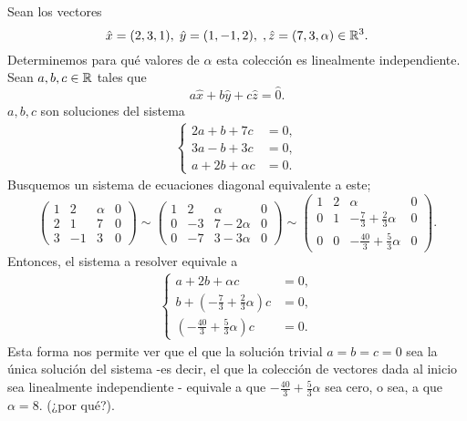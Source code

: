 \begin{ejem}
Sean los vectores
\[
\hat{x} = (2, 3, 1), \hspace{0.1cm} \hat{y} = (1, -1, 2),
\hspace{0.1cm}, \hat{z} = (7, 3, \alpha) \in \mathbb{R}^{3}.
\]
Determinemos para qué valores de $\alpha$ esta colección
es linealmente independiente.
Sean $a, b, c \in \mathbb{R}$ tales que
\[
a \hat{x} + b \hat{y} + c \hat{z} = \hat{0}.
\]
$a, b, c$ son soluciones del sistema
\begin{align*}
\begin{cases}
2a+b+7c & = 0, \\
3a-b+3c & = 0, \\
a+2b+\alpha c & = 0.
\end{cases}
\end{align*}
Busquemos un sistema de ecuaciones diagonal equivalente a este;
\[
\left( \begin{array}{rrr|r} 
1 & 2 & \alpha & 0  \\ 
2 & 1 & 7 & 0  \\ 
3 & -1 & 3 & 0
\end{array} \right) \sim
\left( \begin{array}{rrr|r} 
1 & 2 & \alpha & 0  \\ 
0 & -3 & 7-2\alpha & 0  \\ 
0 & -7 & 3-3\alpha & 0
\end{array} \right) \sim
\left( \begin{array}{rrr|r} 
1 & 2 & \alpha & 0  \\ 
0 & 1 & -\frac{7}{3} + \frac{2}{3} \alpha & 0  \\ 
0 & 0 & -\frac{40}{3}+\frac{5}{3}\alpha & 0
\end{array} \right) .
\]
Entonces, el sistema a resolver equivale a 
\begin{align*}
\begin{cases}
a + 2b+\alpha c & = 0, \\
b + \left( -\frac{7}{3} + \frac{2}{3}
\alpha \right) c & = 0, \\
\left( -\frac{40}{3} + \frac{5}{3} \alpha \right) c & = 0.
\end{cases}
\end{align*}
Esta forma nos permite ver que
el que la solución trivial $a = b = c = 0$ sea
la única solución del sistema
-es decir, el que la colección de vectores dada al inicio
sea linealmente independiente -
equivale a que $-\frac{40}{3} + \frac{5}{3} \alpha$ sea cero,
o sea, a que $\alpha = 8$.
(¿por qué?).
\diam
\end{ejem}

